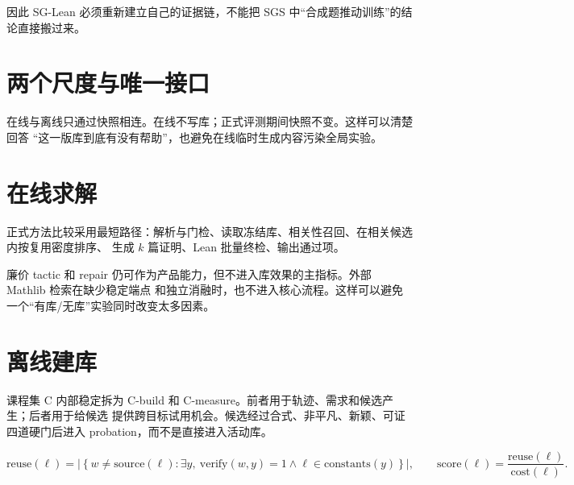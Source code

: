 \documentclass[UTF8,a4paper,11pt,fontset=windows]{ctexart}
\begin{document}
因此 SG-Lean 必须重新建立自己的证据链，不能把 SGS 中“合成题推动训练”的结论直接搬过来。

\section{两个尺度与唯一接口}

\begin{center}
\end{center}

在线与离线只通过快照相连。在线不写库；正式评测期间快照不变。这样可以清楚回答
“这一版库到底有没有帮助”，也避免在线临时生成内容污染全局实验。

\section{在线求解}

正式方法比较采用最短路径：解析与门检、读取冻结库、相关性召回、在相关候选内按复用密度排序、
生成 $k$ 篇证明、Lean 批量终检、输出通过项。

廉价 tactic 和 repair 仍可作为产品能力，但不进入库效果的主指标。外部 Mathlib 检索在缺少稳定端点
和独立消融时，也不进入核心流程。这样可以避免一个“有库/无库”实验同时改变太多因素。

\section{离线建库}

课程集 C 内部稳定拆为 C-build 和 C-measure。前者用于轨迹、需求和候选产生；后者用于给候选
提供跨目标试用机会。候选经过合式、非平凡、新颖、可证四道硬门后进入 probation，而不是直接进入活动库。

\[
\mathrm{reuse}(\ell)=\left|\left\{w\ne\mathrm{source}(\ell):
\exists y,\ \mathrm{verify}(w,y)=1\land \ell\in\mathrm{constants}(y)\right\}\right|,
\qquad
\mathrm{score}(\ell)=\frac{\mathrm{reuse}(\ell)}{\mathrm{cost}(\ell)}.
\]
\end{document}
